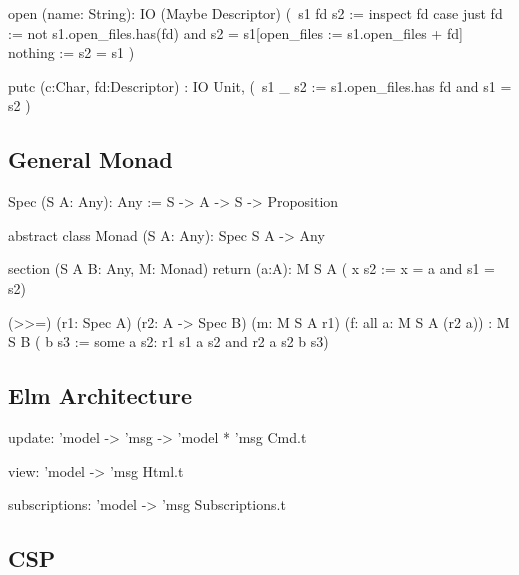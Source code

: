 \begin{alba}
  open (name: String):
       IO (Maybe  Descriptor)
          (\ s1  fd  s2 :=
               inspect fd case
                  just fd :=
                     not s1.open_files.has(fd)
                     and
                     s2 = s1[open_files := s1.open_files + fd]
                  nothing :=
                     s2 = s1 )

  putc (c:Char, fd:Descriptor)
       : IO  Unit,
             (\ s1 _ s2 :=
                  s1.open_files.has fd  and
                  s1 = s2 )
\end{alba}



\subsection{General Monad}

\begin{alba}
  Spec (S A: Any): Any
    := S -> A -> S -> Proposition


  abstract class
    Monad (S A: Any): Spec S A -> Any

  section (S A B: Any, M: Monad)
    return (a:A): M S A
                    ( x s2 :=  x = a  and  s1 = s2)

    (>>=) (r1: Spec A)
          (r2: A -> Spec B)
          (m: M S A r1)
          (f: all a: M S A (r2 a))
          : M S B
              ( b s3 :=
                  some a s2:
                    r1 s1 a s2
                    and
                    r2 a s2 b s3)
\end{alba}











\subsection{Elm Architecture}


\begin{ocaml}
  update: 'model -> 'msg -> 'model * 'msg Cmd.t

  view: 'model -> 'msg Html.t

  subscriptions: 'model -> 'msg Subscriptions.t
\end{ocaml}






\subsection{CSP}













